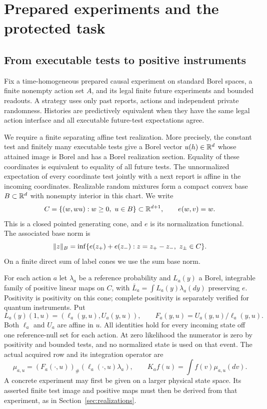 \section{Prepared experiments and the protected task}\label{sec:experiments}
\subsection{From executable tests to positive instruments}
Fix a time-homogeneous prepared causal experiment on standard Borel spaces, a finite nonempty action set $A$, and its legal finite future experiments and bounded readouts. A strategy uses only past reports, actions and independent private randomness. Histories are predictively equivalent when they have the same legal action interface and all executable future-test expectations agree.

We require a finite separating affine test realization. More precisely, the constant test and finitely many executable tests give a Borel vector $u(h)\in\mathbb R^d$ whose attained image is Borel and has a Borel realization section. Equality of these coordinates is equivalent to equality of all future tests. The unnormalized expectation of every coordinate test jointly with a next report is affine in the incoming coordinates. Realizable random mixtures form a compact convex base $B\subset\mathbb R^d$ with nonempty interior in this chart. We write
\[
 C=\{(w,wu):w\ge0,\ u\in B\}\subset\mathbb R^{d+1},\qquad e(w,v)=w.
\]
This is a closed pointed generating cone, and $e$ is its normalization functional. The associated base norm is
\[
 \norm z_B=\inf\{e(z_+)+e(z_-):z=z_+-z_-,\ z_\pm\in C\}.
\]
On a finite direct sum of label cones we use the sum base norm.

For each action $a$ let $\lambda_a$ be a reference probability and $L_a(y)$ a Borel, integrable family of positive linear maps on $C$, with $\bar L_a=\int L_a(y)\lambda_a(dy)$ preserving $e$. Positivity is positivity on this cone; complete positivity is separately verified for quantum instruments. Put
\begin{equation}\label{eq:raw}
 L_a(y)(1,u)=(\ell_a(y,u),U_a(y,u)),\qquad
 F_a(y,u)=U_a(y,u)/\ell_a(y,u).
\end{equation}
Both $\ell_a$ and $U_a$ are affine in $u$. All identities hold for every incoming state off one reference-null set for each action. At zero likelihood the numerator is zero by positivity and bounded tests, and no normalized state is used on that event. The actual acquired row and its integration operator are
\begin{equation}\label{eq:row}
 \mu_{a,u}=(F_a(\cdot,u))_\#(\ell_a(\cdot,u)\lambda_a),\qquad
 K_af(u)=\int f(v)\mu_{a,u}(dv).
\end{equation}
A concrete experiment may first be given on a larger physical state space. Its asserted finite test image and positive maps must then be derived from that experiment, as in Section~\ref{sec:realizations}.

